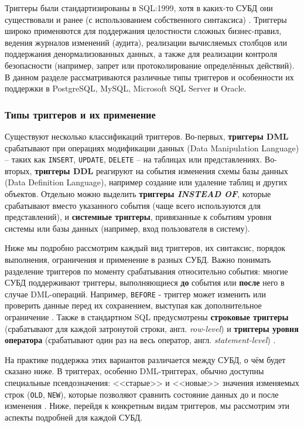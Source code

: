  Триггеры были стандартизированы в SQL:1999, хотя в каких-то СУБД они существовали и ранее (с использованием собственного синтаксиса) \autocite{Silberschatz}. Триггеры широко применяются для поддержания целостности сложных бизнес-правил, ведения журналов изменений (аудита), реализации вычисляемых столбцов или поддержания денормализованных данных, а также для реализации контроля безопасности (например, запрет или протоколирование определённых действий). В данном разделе рассматриваются различные типы триггеров и особенности их поддержки в PostgreSQL, MySQL, Microsoft SQL Server и Oracle.

\subsubsection{Типы триггеров и их применение}

 Существуют несколько классификаций триггеров. Во-первых, \textbf{триггеры DML} срабатывают при операциях модификации данных (Data Manipulation Language) – таких как \texttt{INSERT}, \texttt{UPDATE}, \texttt{DELETE} – на таблицах или представлениях. Во-вторых, \textbf{триггеры DDL} реагируют на события изменения схемы базы данных (Data Definition Language), например создание или удаление таблиц и других объектов. Отдельно можно выделить \textbf{триггеры \textit{INSTEAD OF}}, которые срабатывают вместо указанного события (чаще всего используются для представлений), и \textbf{системные триггеры}, привязанные к событиям уровня системы или базы данных (например, вход пользователя в систему). 
 
 Ниже мы подробно рассмотрим каждый вид триггеров, их синтаксис, порядок выполнения, ограничения и применение в разных СУБД. Важно понимать разделение триггеров по моменту срабатывания относительно события: многие СУБД поддерживают триггеры, выполняющиеся \textbf{до} события или \textbf{после} него в случае DML-операций. Например, \texttt{BEFORE} - триггер может изменить или проверить данные перед их сохранением, выступая как дополнительное ограничение \autocite{Silberschatz}. Также в стандартном SQL предусмотрены \textbf{строковые триггеры} (срабатывают для каждой затронутой строки, англ. \textit{row-level}) и \textbf{триггеры уровня оператора} (срабатывают один раз на весь оператор, англ. \textit{statement-level}) \autocite{Silberschatz}. 
 
 На практике поддержка этих вариантов различается между СУБД, о чём будет сказано ниже. В триггерах, особенно DML-триггерах, обычно доступны специальные псевдозначения: <<старые>> и <<новые>> значения изменяемых строк (\texttt{OLD}, \texttt{NEW}), которые позволяют сравнить состояние данных до и после изменения \autocite{Silberschatz}. Ниже, перейдя к конкретным видам триггеров, мы рассмотрим эти аспекты подробней для каждой СУБД.

